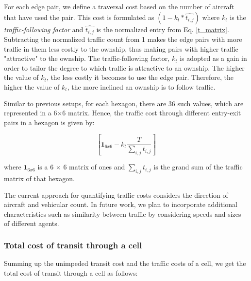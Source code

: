 \documentclass[conference, letter]{IEEEtran}
\begin{document}
For each edge pair, we define a traversal cost based on the number of aircraft that have used the pair. This cost is formulated as $(1 - k_t*{\hat{t_{i, j}}})$ where $k_t$ is the \textit{traffic-following factor} and $\hat{t_{i, j}}$ is the normalized entry from Eq. \ref{t_matrix}. Subtracting the normalized traffic count from 1 makes the edge pairs with more traffic in them less costly to the ownship, thus making pairs with higher traffic "attractive" to the ownship. The traffic-following factor, $k_t$ is adopted as a gain in order to tailor the degree to which traffic is attractive to an ownship. The higher the value of $k_t$, the less costly it becomes to use the edge pair. Therefore, the higher the value of $k_t$, the more inclined an ownship is to follow traffic. 

Similar to previous setups, for each hexagon, there are 36 such values, which are represented in a 6$\times$6 matrix. Hence, the traffic cost through different entry-exit pairs in a hexagon is given by: 


\begin{equation}
    \label{t_cost}
    \left[
\textbf{1}_{6x6} - k_t\frac{T}{\sum_{i, j}t_{i, j}}
\right]
\end{equation}

where $\textbf{1}_{6x6}$ is a 6 $\times$ 6 matrix of ones and $\sum_{i, j}t_{i, j}$ is the grand sum of the traffic matrix of that hexagon. 

The current approach for quantifying traffic costs considers the direction of aircraft and vehicular count. In future work, we plan to incorporate additional characteristics such as similarity between traffic by considering speeds and sizes of different agents. 

\subsubsection*{Total cost of transit through a cell} 
Summing up the unimpeded transit cost and the traffic costs of a cell, we get the total cost of transit through a cell as follows:
\end{document}
